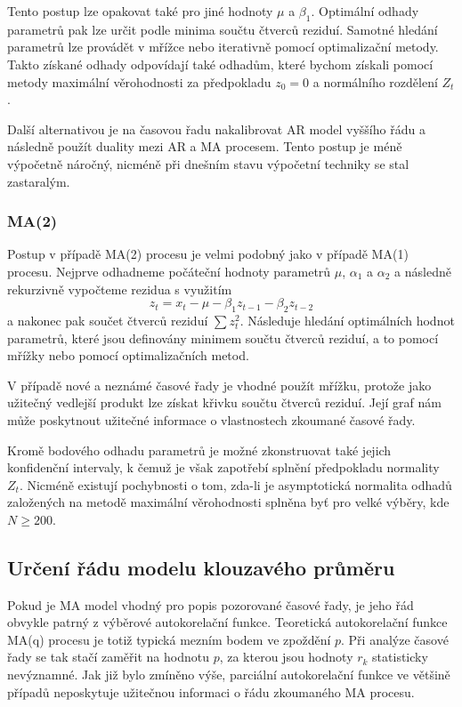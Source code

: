 Tento postup lze opakovat také pro jiné hodnoty $\mu$ a $\beta_1$. Optimální odhady parametrů pak lze určit podle minima součtu čtverců reziduí. Samotné hledání parametrů lze provádět v mřížce nebo iterativně pomocí optimalizační metody. Takto získané odhady odpovídají také odhadům, které bychom získali pomocí metody maximální věrohodnosti za předpokladu $z_0 = 0$ a normálního rozdělení $Z_t$.

Další alternativou je na časovou řadu nakalibrovat AR model vyššího řádu a následně použít duality mezi AR a MA procesem. Tento postup je méně výpočetně náročný, nicméně při dnešním stavu výpočetní techniky se stal zastaralým.

\subsubsection{MA(2)}

Postup v případě MA(2) procesu je velmi podobný jako v případě MA(1) procesu. Nejprve odhadneme počáteční hodnoty parametrů $\mu$, $\alpha_1$ a $\alpha_2$ a následně rekurzivně vypočteme rezidua s využitím
\begin{equation}
z_t = x_t - \mu - \beta_1 z_{t - 1} - \beta_2 z_{t - 2}
\end{equation}
a nakonec pak součet čtverců reziduí $\sum z_t^2$. Následuje hledání optimálních hodnot parametrů, které jsou definovány minimem součtu čtverců reziduí, a to pomocí mřížky nebo pomocí optimalizačních metod.

V případě nové a neznámé časové řady je vhodné použít mřížku, protože jako užitečný vedlejší produkt lze získat křivku součtu čtverců reziduí. Její graf nám může poskytnout užitečné informace o vlastnostech zkoumané časové řady.

Kromě bodového odhadu parametrů je možné zkonstruovat také jejich konfidenční intervaly, k čemuž je však zapotřebí splnění předpokladu normality $Z_t$. Nicméně existují pochybnosti o tom, zda-li je asymptotická normalita odhadů založených na metodě maximální věrohodnosti splněna byť pro velké výběry, kde $N \ge 200$.

\subsection{Určení řádu modelu klouzavého průměru}

Pokud je MA model vhodný pro popis pozorované časové řady, je jeho řád obvykle patrný z výběrové autokorelační funkce. Teoretická autokorelační funkce MA(q) procesu je totiž typická mezním bodem ve zpoždění $p$. Při analýze časové řady se tak stačí zaměřit na hodnotu $p$, za kterou jsou hodnoty $r_k$ statisticky nevýznamné. Jak již bylo zmíněno výše, parciální autokorelační funkce ve většině případů neposkytuje užitečnou informaci o řádu zkoumaného MA procesu.

